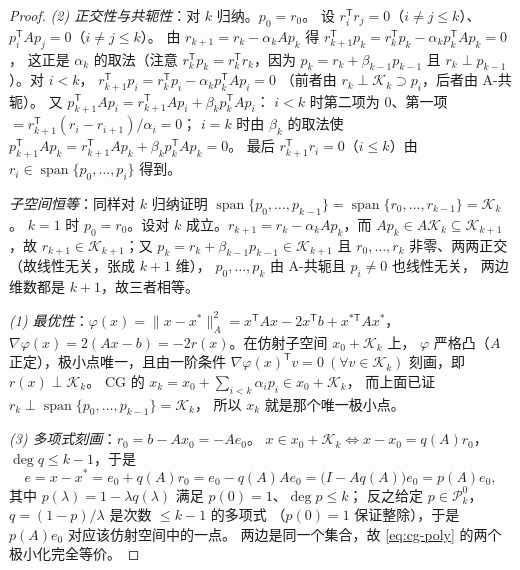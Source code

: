 \begin{proof}
\emph{(2) 正交性与共轭性}：对 $k$ 归纳。$p_0=r_0$。
设 $r_i^{\mathsf T}r_j=0$（$i\ne j\le k$）、$p_i^{\mathsf T}Ap_j=0$（$i\ne j\le k$）。
由 $r_{k+1}=r_k-\alpha_kAp_k$ 得
$r_{k+1}^{\mathsf T}p_k=r_k^{\mathsf T}p_k-\alpha_kp_k^{\mathsf T}Ap_k=0$，
这正是 $\alpha_k$ 的取法（注意 $r_k^{\mathsf T}p_k=r_k^{\mathsf T}r_k$，因为
$p_k=r_k+\beta_{k-1}p_{k-1}$ 且 $r_k\perp p_{k-1}$）。对 $i<k$，
$r_{k+1}^{\mathsf T}p_i=r_k^{\mathsf T}p_i-\alpha_kp_k^{\mathsf T}Ap_i=0$
（前者由 $r_k\perp\mathcal K_k\supset p_i$，后者由 A-共轭）。
又 $p_{k+1}^{\mathsf T}Ap_i=r_{k+1}^{\mathsf T}Ap_i+\beta_kp_k^{\mathsf T}Ap_i$：
$i<k$ 时第二项为 $0$、第一项 $=r_{k+1}^{\mathsf T}(r_i-r_{i+1})/\alpha_i=0$；
$i=k$ 时由 $\beta_k$ 的取法使 $p_{k+1}^{\mathsf T}Ap_k
=r_{k+1}^{\mathsf T}Ap_k+\beta_kp_k^{\mathsf T}Ap_k=0$。
最后 $r_{k+1}^{\mathsf T}r_i=0$（$i\le k$）由 $r_i\in\operatorname{span}\{p_0,\dots,p_i\}$ 得到。

\emph{子空间恒等}：同样对 $k$ 归纳证明
$\operatorname{span}\{p_0,\dots,p_{k-1}\}=\operatorname{span}\{r_0,\dots,r_{k-1}\}=\mathcal K_k$。
$k=1$ 时 $p_0=r_0$。设对 $k$ 成立。$r_{k+1}=r_k-\alpha_kAp_k$，而
$Ap_k\in A\mathcal K_k\subseteq\mathcal K_{k+1}$，故
$r_{k+1}\in\mathcal K_{k+1}$；又 $p_k=r_k+\beta_{k-1}p_{k-1}\in\mathcal K_{k+1}$ 且
$r_0,\dots,r_k$ 非零、两两正交（故线性无关，张成 $k+1$ 维），
$p_0,\dots,p_k$ 由 A-共轭且 $p_i\ne0$ 也线性无关，
两边维数都是 $k+1$，故三者相等。

\emph{(1) 最优性}：$\varphi(x)=\|x-x^\ast\|_A^2=x^{\mathsf T}Ax-2x^{\mathsf T}b+x^{\ast\mathsf T}Ax^\ast$，
$\nabla\varphi(x)=2(Ax-b)=-2r(x)$。在仿射子空间 $x_0+\mathcal K_k$ 上，
$\varphi$ 严格凸（$A$ 正定），极小点唯一，且由一阶条件
$\nabla\varphi(x)^{\mathsf T}v=0\ (\forall v\in\mathcal K_k)$ 刻画，即 $r(x)\perp\mathcal K_k$。
CG 的 $x_k=x_0+\sum_{i<k}\alpha_ip_i\in x_0+\mathcal K_k$，
而上面已证 $r_k\perp\operatorname{span}\{p_0,\dots,p_{k-1}\}=\mathcal K_k$，
所以 $x_k$ 就是那个唯一极小点。

\emph{(3) 多项式刻画}：$r_0=b-Ax_0=-Ae_0$。
$x\in x_0+\mathcal K_k\iff x-x_0=q(A)r_0$，$\deg q\le k-1$，于是
\begin{equation}
  e=x-x^\ast=e_0+q(A)r_0=e_0-q(A)Ae_0=\bigl(I-Aq(A)\bigr)e_0=p(A)e_0,
\end{equation}
其中 $p(\lambda)=1-\lambda q(\lambda)$ 满足 $p(0)=1$、$\deg p\le k$；
反之给定 $p\in\mathcal P_k^0$，$q=(1-p)/\lambda$ 是次数 $\le k-1$ 的多项式
（$p(0)=1$ 保证整除），于是 $p(A)e_0$ 对应该仿射空间中的一点。
两边是同一个集合，故 \eqref{eq:cg-poly} 的两个极小化完全等价。
\end{proof}

